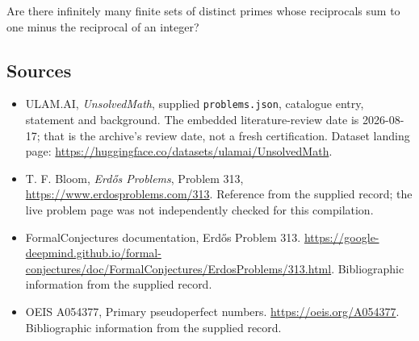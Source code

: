 \documentclass[11pt,a4paper]{article}
\begin{document}
Are there infinitely many finite sets of distinct primes whose reciprocals sum to one minus the reciprocal of an integer?

\subsection{Sources}

{\small

\begin{itemize}

\item[\hypertarget{source:statement:1}{S1}] ULAM.AI, \emph{UnsolvedMath}, supplied \texttt{problems.json}, catalogue entry, statement and background. The embedded literature-review date is 2026-08-17; that is the archive’s review date, not a fresh certification. Dataset landing page: \url{https://huggingface.co/datasets/ulamai/UnsolvedMath}.

\item[\hypertarget{source:statement:2}{S2}] T. F. Bloom, \emph{Erdős Problems}, Problem 313, \url{https://www.erdosproblems.com/313}. Reference from the supplied record; the live problem page was not independently checked for this compilation.

\item[\hypertarget{source:statement:3}{S3}] FormalConjectures documentation, Erdős Problem 313. \url{https://google-deepmind.github.io/formal-conjectures/doc/FormalConjectures/ErdosProblems/313.html}. Bibliographic information from the supplied record.

\item[\hypertarget{source:statement:4}{S4}] OEIS A054377, Primary pseudoperfect numbers. \url{https://oeis.org/A054377}. Bibliographic information from the supplied record.

\end{itemize}

}

\label{end:statement}
\end{document}
